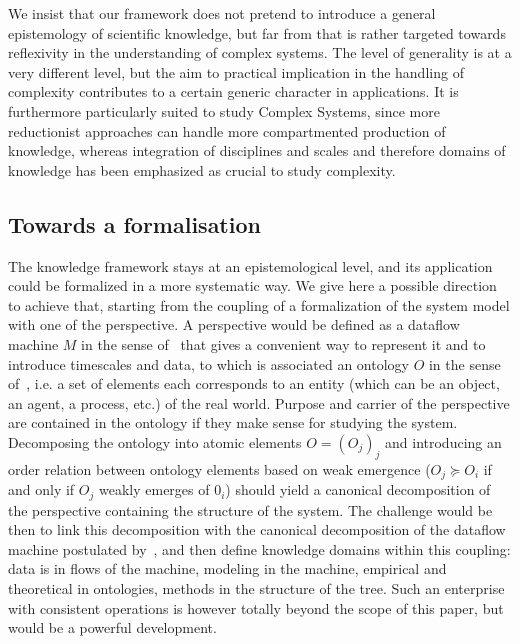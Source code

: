 \documentclass[runningheads,a4paper]{llncs2e/llncs}
\begin{document}
We insist that our framework does not pretend to introduce a general epistemology of scientific knowledge, but far from that is rather targeted towards reflexivity in the understanding of complex systems. The level of generality is at a very different level, but the aim to practical implication in the handling of complexity contributes to a certain generic character in applications. It is furthermore particularly suited to study Complex Systems, since more reductionist approaches can handle more compartmented production of knowledge, whereas integration of disciplines and scales and therefore domains of knowledge has been emphasized as crucial to study complexity.


\subsection{Towards a formalisation}

The knowledge framework stays at an epistemological level, and its application could be formalized in a more systematic way. We give here a possible direction to achieve that, starting from the coupling of a formalization of the system model with one of the perspective. A perspective would be defined as a dataflow machine $M$ in the sense of~\cite{golden2012modeling} that gives a convenient way to represent it and to introduce timescales and data, to which is associated an ontology $O$ in the sense of~\cite{livet2010}, i.e. a set of elements each corresponds to an entity (which can be an object, an agent, a process, etc.) of the real world. Purpose and carrier of the perspective are contained in the ontology if they make sense for studying the system. Decomposing the ontology into atomic elements $O=(O_j)_j$ and introducing an order relation between ontology elements based on weak emergence ($O_j\succcurlyeq O_i$ if and only if $O_j$ weakly emerges of $0_i$) should yield a canonical decomposition of the perspective containing the structure of the system. The challenge would be then to link this decomposition with the canonical decomposition of the dataflow machine postulated by~\cite{golden2012modeling}, and then define knowledge domains within this coupling: data is in flows of the machine, modeling in the machine, empirical and theoretical in ontologies, methods in the structure of the tree. Such an enterprise with consistent operations is however totally beyond the scope of this paper, but would be a powerful development.
\end{document}
